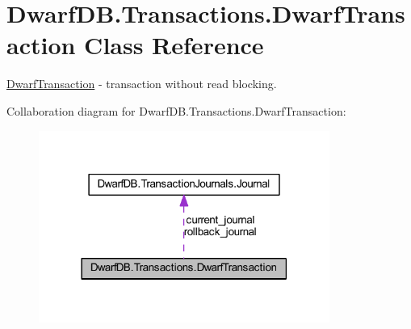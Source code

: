\hypertarget{class_dwarf_d_b_1_1_transactions_1_1_dwarf_transaction}{
\section{DwarfDB.Transactions.DwarfTransaction Class Reference}
\label{class_dwarf_d_b_1_1_transactions_1_1_dwarf_transaction}
}


\hyperlink{class_dwarf_d_b_1_1_transactions_1_1_dwarf_transaction}{DwarfTransaction} -\/ transaction without read blocking.  




Collaboration diagram for DwarfDB.Transactions.DwarfTransaction:\nopagebreak
\begin{figure}[H]
\begin{center}
\leavevmode
\includegraphics[width=270pt]{class_dwarf_d_b_1_1_transactions_1_1_dwarf_transaction__coll__graph}
\end{center}
\end{figure}

